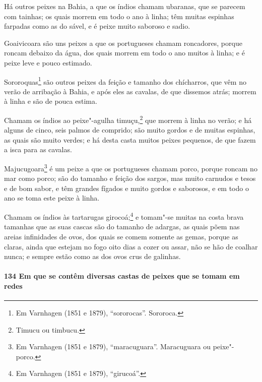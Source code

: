 Há outros peixes na Bahia, a que os índios chamam ubaranas, que se parecem com tainhas; os
quais morrem em todo o ano à linha; têm muitas espinhas farpadas como as do sável, e é
peixe muito saboroso e sadio.

Goaivicoara são uns peixes a que os portugueses chamam roncadores, porque roncam debaixo
da água, dos quais morrem em todo o ano muitos à linha; e é peixe leve e pouco estimado.

Sororoquas\footnote{ Em Varnhagen (1851 e 1879), ``sororocas''. Sororoca.} são outros
peixes da feição e tamanho dos chícharros, que vêm no verão de arribação à Bahia, e após
eles as cavalas, de que dissemos atrás; morrem à linha e são de pouca estima.

Chamam os índios ao peixe"-agulha timuçu,\footnote{ Timucu ou timbucu.} que morrem à linha
no verão; e há alguns de cinco, seis palmos de comprido; são muito gordos e de muitas
espinhas, as quais são muito verdes; e há desta casta muitos peixes pequenos, de que fazem
a isca para as cavalas.

Majucugoara\footnote{ Em Varnhagen (1851 e 1879), ``maracuguara''. Maracuguara ou
peixe"-porco.} é um peixe a que os portugueses chamam porco, porque roncam no mar como
porco; são do tamanho e feição dos sargos, mas muito carnudos e tesos e de bom sabor, e
têm grandes fígados e muito gordos e saborosos, e em todo o ano se toma este peixe à
linha.

Chamam os índios às tartarugas girocoá;\footnote{ Em Varnhagen (1851 e 1879),
``girucoá''.} e tomam"-se muitas na costa brava tamanhas que as suas cascas são do tamanho
de adargas, as quais põem nas areias infinidades de ovos, dos quais se comem somente as
gemas, porque as claras, ainda que estejam no fogo oito dias a cozer ou assar, não se hão
de coalhar nunca; e sempre estão como as dos ovos crus de galinhas.

\paragraph{134 Em que se contêm diversas castas de peixes que se tomam em redes}


